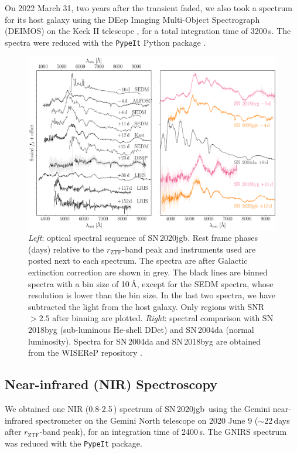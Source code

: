 \documentclass[twocolumn]{aastex631}
\newcommand{\sn}{SN\,2020jgb}
\begin{document}
On 2022 March 31, two years after the transient faded, we also took a spectrum for its host galaxy using the DEep Imaging Multi-Object Spectrograph (DEIMOS) on the Keck II telescope \citep{DEIMOS_2003}, for a total integration time of 3200\,s. The spectra were reduced with the \texttt{PypeIt} Python package \citep{pypeit:joss_pub}.


\begin{figure}
    \centering
    \includegraphics[width=\textwidth]{optical_spec_evolution.pdf}
    \caption{\textit{Left}: optical spectral sequence of \sn. Rest frame phases (days) relative to the $r_\mathrm{ZTF}$-band peak and instruments used are posted next to each spectrum. The spectra are after Galactic extinction correction are shown in grey. The black lines are binned spectra with a bin size of 10\,\r{A}, except for the SEDM spectra, whose resolution is lower than the bin size. In the last two spectra, we have subtracted the light from the host galaxy. Only regions with SNR $>2.5$ after binning are plotted. 
    \textit{Right}: spectral comparison with SN\,2018byg (sub-luminous He-shell DDet) and SN\,2004da (normal luminosity). Spectra for SN\,2004da and SN\,2018byg are obtained from the WISEReP repository \citep{wiserep_2012}.} %
    \label{fig:spec_evo}
\end{figure}

\subsection{Near-infrared (NIR) Spectroscopy}
We obtained one NIR (0.8-2.5\,\micron) spectrum of \sn\ using the Gemini near-infrared spectrometer \citep[GNIRS;][]{GNIRS1998} on the Gemini North telescope on 2020 June 9 ($\sim$22\,days after $r_\mathrm{ZTF}$-band peak), for an integration time of 2400\,s. The GNIRS spectrum was reduced with the \texttt{PypeIt} package.
\end{document}
